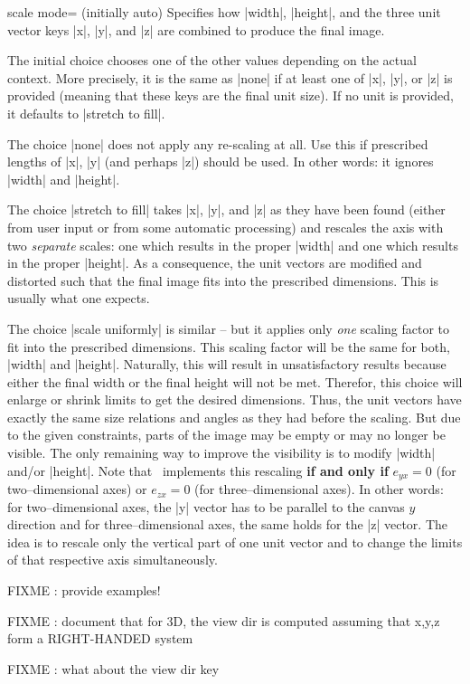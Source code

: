\begin{pgfplotskey}{scale mode= (initially auto)}
	Specifies how |width|, |height|, and the three unit vector keys |x|, |y|, and |z| are combined to produce the final image.

	The initial choice  chooses one of the other values depending on the actual context. More precisely, it is the same as |none| if at least one of |x|, |y|, or |z| is provided (meaning that these keys are the final unit size). If no unit is provided, it defaults to |stretch to fill|.

	The choice |none| does not apply any re-scaling at all. Use this if prescribed lengths of |x|, |y| (and perhaps |z|) should be used. In other words: it ignores |width| and |height|.

	The choice |stretch to fill| takes |x|, |y|, and |z| as they have been found (either from user input or from some automatic processing) and rescales the axis with two \emph{separate} scales: one which results in the proper |width| and one which results in the proper |height|. As a consequence, the unit vectors are modified and distorted such that the final image fits into the prescribed dimensions. This is usually what one expects.
	
	The choice |scale uniformly| is similar -- but it applies only \emph{one} scaling factor to fit into the prescribed dimensions. This scaling factor will be the same for both, |width| and |height|. Naturally, this will result in unsatisfactory results because either the final width or the final height will not be met. Therefor, this choice will enlarge or shrink limits to get the desired dimensions. Thus, the unit vectors have exactly the same size relations and angles as they had before the scaling. But due to the given constraints, parts of the image may be empty or may no longer be visible. The only remaining way to improve the visibility is to modify |width| and/or |height|. Note that \PGFPlots\ implements this rescaling \textbf{if and only if} $e_{yx} = 0$ (for two--dimensional axes) or $e_{zx} = 0$ (for three--dimensional axes). In other words: for two--dimensional axes, the |y| vector has to be parallel to the canvas $y$ direction and for three--dimensional axes, the same holds for the |z| vector. The idea is to rescale only the vertical part of one unit vector and to change the limits of that respective axis simultaneously.

	FIXME : provide examples!

	FIXME : document that for 3D, the view dir is computed assuming that x,y,z form a RIGHT-HANDED system

	FIXME : what about the view dir key
\end{pgfplotskey}

